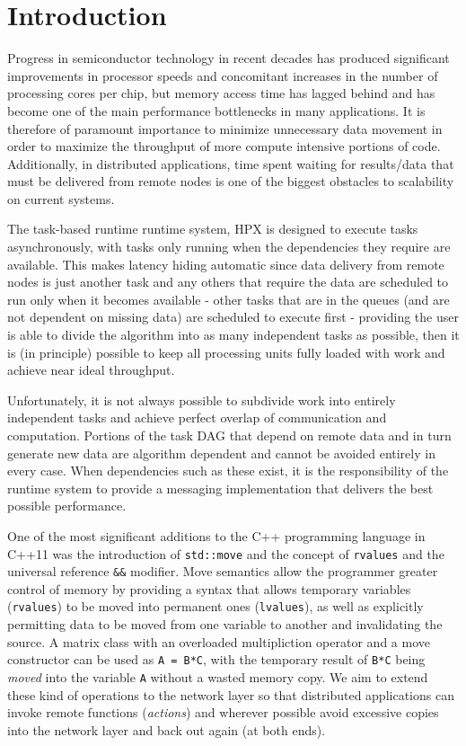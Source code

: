\section{Introduction}

Progress in semiconductor technology in recent decades has produced significant 
improvements in processor speeds and concomitant increases in the number of 
processing cores per chip, but memory access time has lagged behind and 
has become one of the main performance bottlenecks in many applications. 
It is therefore of paramount importance to minimize
unnecessary data movement in order to maximize the throughput of more
compute intensive portions of code. 
Additionally, in distributed applications, time spent waiting for results/data 
that must be delivered from remote nodes is one of the biggest obstacles
to scalability on current systems.

The task-based runtime runtime system, HPX is designed to execute 
tasks asynchronously, with tasks only running when the dependencies they
require are available. 
This makes latency hiding automatic since data delivery from remote nodes
is just another task and any others that require the data are scheduled
to run only when it becomes available - 
other tasks that are in the queues (and are not dependent on missing data) 
are scheduled to execute first - providing the user is able to divide 
the algorithm into as many independent tasks as possible, 
then it is (in principle) possible to keep all processing units fully 
loaded with work and achieve near ideal throughput.

Unfortunately, it is not always possible to subdivide work into entirely
independent tasks and achieve perfect overlap of communication and computation.
Portions of the task DAG that depend on remote data and in turn generate new data
are algorithm dependent and cannot be avoided entirely in every case. 
When dependencies such as these exist, it is the responsibility of the runtime
system to provide a messaging implementation that delivers the best possible
performance.

One of the most significant additions to the C++ programming language in C++11
was the introduction of \lstinline!std::move!
and the concept of \lstinline!rvalues! and the universal reference 
\lstinline!&&! modifier.
Move semantics allow the programmer greater control of memory by providing 
a syntax that allows temporary variables (\lstinline!rvalues!) to be moved
into permanent ones (\lstinline!lvalues!), as well as explicitly permitting 
data to be moved from one variable to another and invalidating the source.
A matrix class with an overloaded multipliction operator and 
a move constructor can be used
as \lstinline!A = B*C!, with the temporary result of \lstinline!B*C! being 
\textit{moved} into the variable \lstinline!A! without a wasted memory copy.
We aim to extend these kind of operations to the network layer so that
distributed applications can invoke remote functions (\textit{actions})
and wherever possible avoid excessive copies into the network layer and 
back out again (at both ends).


